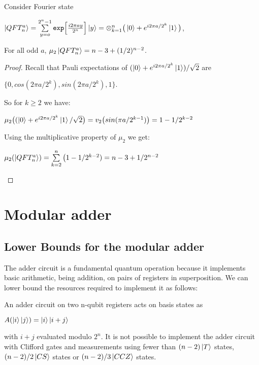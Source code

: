 \documentclass[12pt]{dalthesis}
\begin{document}
\begin{proposition}
Consider Fourier state
\begin{center}
$\ket{QFT_n^a} = \sum\limits_{y=o}^{2^n-1} \texttt{exp}\Big[ \frac{i2\pi ay}{2^n} \Big] \ket{y} = \otimes_{k=1}^n \big( \ket{0} + e^{i2\pi a/2^k}\ket{1}\big)$,
\end{center}
For all odd $a$, $\mu_2\ket{QFT_n^a} = n-3 +(1/2)^{n-2}$.
\end{proposition}
\begin{proof}
Recall that Pauli expectations of $(\ket{0} + e^{i2\pi a/2^k}\ket{1})/\sqrt{2}$ are
\begin{center}
$\{ 0, cos(2\pi a/2^k), sin(2\pi a/2^k), 1 \}$.
\end{center}
So for $k \geq 2$ we have:
\begin{center}
$\mu_2 \big( (\ket{0} + e^{i2\pi a/2^k} \ket{1}/\sqrt{2} \big) = v_2 \big( sin(\pi a/2^{k-1}) \big) = 1 - 1/2^{k-2}$
\end{center}
Using the multiplicative property of $\mu_2$ we get:
\begin{center}
$\mu_2 (\ket{QFT_n^a}) = \sum\limits_{k=2}^n \big( 1-1/2^{k-2}) = n-3 + 1/2^{n-2}$
\end{center}
\end{proof}


\section{Modular adder}
\subsection{Lower Bounds for the modular adder}
The adder circuit is a fundamental quantum operation because it implements basic arithmetic, being addition, on pairs of registers in superposition. We can lower bound the resources required to implement it as follows:

\begin{proposition}
An adder circuit on two n-qubit registers acts on basis states as 
\begin{center}
$A(\ket{i} \ket{j}) = \ket{i} \ket{i+j}$
\end{center}
with $i + j$ evaluated modulo $2^n$. It is not possible to implement the adder circuit with Clifford gates and measurements using fewer than $(n-2) \ket{T}$ states, $(n-2)/2 \ket{CS}$ states or $(n-2)/3 \ket{CCZ}$ states.
\end{proposition}
\end{document}
